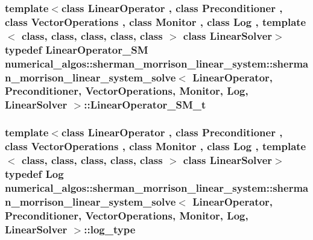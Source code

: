 \hypertarget{classnumerical__algos_1_1sherman__morrison__linear__system_1_1sherman__morrison__linear__system__solve_a27aa5b8ed7e0d3bf53d48698f32aea16}{
\subsubsection[{Linear\-Operator\-\_\-\-S\-M\-\_\-t}]{\setlength{\rightskip}{0pt plus 5cm}template$<$class Linear\-Operator , class Preconditioner , class Vector\-Operations , class Monitor , class Log , template$<$ class, class, class, class, class $>$ class Linear\-Solver$>$ typedef Linear\-Operator\-\_\-\-S\-M {\bf numerical\-\_\-algos\-::sherman\-\_\-morrison\-\_\-linear\-\_\-system\-::sherman\-\_\-morrison\-\_\-linear\-\_\-system\-\_\-solve}$<$ Linear\-Operator, Preconditioner, Vector\-Operations, Monitor, Log, Linear\-Solver $>$\-::{\bf Linear\-Operator\-\_\-\-S\-M\-\_\-t}}}\label{classnumerical__algos_1_1sherman__morrison__linear__system_1_1sherman__morrison__linear__system__solve_a27aa5b8ed7e0d3bf53d48698f32aea16}
\hypertarget{classnumerical__algos_1_1sherman__morrison__linear__system_1_1sherman__morrison__linear__system__solve_a4b4703435cfb529507ef87613ab87214}{
\subsubsection[{log\-\_\-type}]{\setlength{\rightskip}{0pt plus 5cm}template$<$class Linear\-Operator , class Preconditioner , class Vector\-Operations , class Monitor , class Log , template$<$ class, class, class, class, class $>$ class Linear\-Solver$>$ typedef Log {\bf numerical\-\_\-algos\-::sherman\-\_\-morrison\-\_\-linear\-\_\-system\-::sherman\-\_\-morrison\-\_\-linear\-\_\-system\-\_\-solve}$<$ Linear\-Operator, Preconditioner, Vector\-Operations, Monitor, Log, Linear\-Solver $>$\-::{\bf log\-\_\-type}}}\label{classnumerical__algos_1_1sherman__morrison__linear__system_1_1sherman__morrison__linear__system__solve_a4b4703435cfb529507ef87613ab87214}
